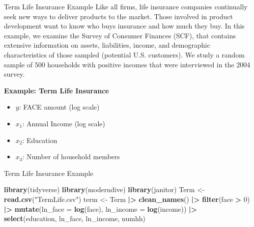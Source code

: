 \documentclass[
  ignorenonframetext,
]{beamer}
\newenvironment{Shaded}{\begin{snugshade}}{\end{snugshade}}
\newcommand{\AttributeTok}[1]{\textcolor[rgb]{0.13,0.29,0.53}{#1}}
\newcommand{\DecValTok}[1]{\textcolor[rgb]{0.00,0.00,0.81}{#1}}
\newcommand{\FunctionTok}[1]{\textcolor[rgb]{0.13,0.29,0.53}{\textbf{#1}}}
\newcommand{\NormalTok}[1]{#1}
\newcommand{\OtherTok}[1]{\textcolor[rgb]{0.56,0.35,0.01}{#1}}
\newcommand{\SpecialCharTok}[1]{\textcolor[rgb]{0.81,0.36,0.00}{\textbf{#1}}}
\newcommand{\StringTok}[1]{\textcolor[rgb]{0.31,0.60,0.02}{#1}}
\providecommand{\tightlist}{%
  \setlength{\itemsep}{0pt}\setlength{\parskip}{0pt}}
\begin{document}
\begin{frame}{Term Life Insurance Example}
\label{term-life-insurance-example}
Like all firms, life insurance companies continually seek new ways to
deliver products to the market. Those involved in product development
want to know who buys insurance and how much they buy. In this example,
we examine the Survey of Consumer Finances (SCF), that contains
extensive information on assets, liabilities, income, and demographic
characteristics of those sampled (potential U.S. customers). We study a
random sample of 500 households with positive incomes that were
interviewed in the 2004 survey.

\textbf{Example: Term Life Insurance}

\begin{itemize}
\tightlist
\item
  \(y\): FACE amount (log scale)
\item
  \(x_1\): Annual Income (log scale)
\item
  \(x_2\): Education
\item
  \(x_3\): Number of household members
\end{itemize}
\end{frame}

\begin{frame}[fragile]{Term Life Insurance Example}
\label{term-life-insurance-example-1}
\normalsize

\begin{Shaded}
\begin{Highlighting}[]
\FunctionTok{library}\NormalTok{(tidyverse)}
\FunctionTok{library}\NormalTok{(moderndive)}
\FunctionTok{library}\NormalTok{(janitor)}
\NormalTok{Term }\OtherTok{\textless{}{-}} \FunctionTok{read.csv}\NormalTok{(}\StringTok{"TermLife.csv"}\NormalTok{)}
\NormalTok{term }\OtherTok{\textless{}{-}}\NormalTok{ Term }\SpecialCharTok{|\textgreater{}} 
  \FunctionTok{clean\_names}\NormalTok{() }\SpecialCharTok{|\textgreater{}} 
  \FunctionTok{filter}\NormalTok{(face }\SpecialCharTok{\textgreater{}} \DecValTok{0}\NormalTok{) }\SpecialCharTok{|\textgreater{}} 
  \FunctionTok{mutate}\NormalTok{(}\AttributeTok{ln\_face =} \FunctionTok{log}\NormalTok{(face), }\AttributeTok{ln\_income =} \FunctionTok{log}\NormalTok{(income)) }\SpecialCharTok{|\textgreater{}} 
  \FunctionTok{select}\NormalTok{(education, ln\_face, ln\_income, numhh)}
\end{Highlighting}
\end{Shaded}

\normalsize
\end{frame}
\end{document}
